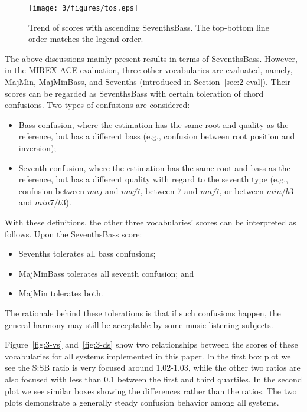 \begin{figure}[htb]
\centering
\texttt{[image: 3/figures/tos.eps]}
\caption{Trend of scores with ascending SeventhsBass. The top-bottom line order matches the legend order.}
\label{fig:3-tos}
\end{figure}

The above discussions mainly present results in terms of SeventhsBass. However, in the MIREX ACE evaluation, three other vocabularies are evaluated, namely, MajMin, MajMinBass, and Sevenths (introduced in Section~\ref{sec:2-eval}). Their scores can be regarded as SeventhsBass with certain toleration of chord confusions. Two types of confusions are considered:
\begin{itemize}
\item Bass confusion, where the estimation has the same root and quality as the reference, but has a different bass (e.g., confusion between root position and inversion);
\item Seventh confusion, where the estimation has the same root and bass as the reference, but has a different quality with regard to the seventh type (e.g., confusion between $maj$ and $maj7$, between $7$ and $maj7$, or between $min/b3$ and $min7/b3$).
\end{itemize}

With these definitions, the other three vocabularies' scores can be interpreted as follows. Upon the SeventhsBass score:
\begin{itemize}
\item Sevenths tolerates all bass confusions;
\item MajMinBass tolerates all seventh confusion; and
\item MajMin tolerates both.
\end{itemize}
The rationale behind these tolerations is that if such confusions happen, the general harmony may still be acceptable by some music listening subjects.

Figure~\ref{fig:3-vs} and~\ref{fig:3-ds} show two relationships between the scores of these vocabularies for all systems implemented in this paper. In the first box plot we see the S:SB ratio is very focused around 1.02-1.03, while the other two ratios are also focused with less than 0.1 between the first and third quartiles. In the second plot we see similar boxes showing the differences rather than the ratios. The two plots demonstrate a generally steady confusion behavior among all systems.

